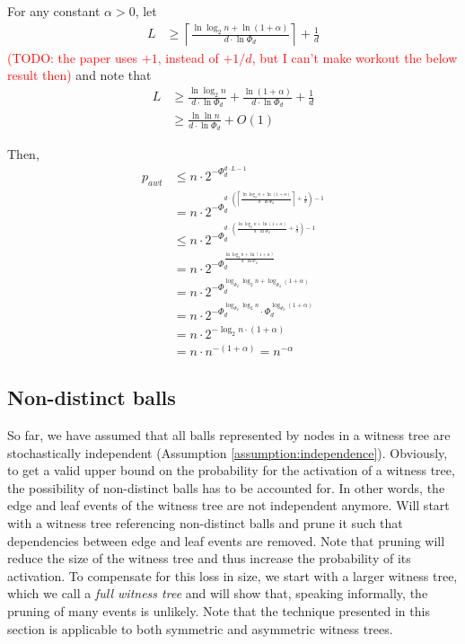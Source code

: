 \documentclass[a4paper,12pt]{article}
\newcommand\todo[1]{\textcolor{red}{(TODO: #1)}}
\begin{document}
For any constant $\alpha > 0$, let 
\begin{align}
L &\geq \left\lceil{\frac{\ln\log_2 n + \ln\left(1+\alpha\right)}{d\cdot \ln \Phi_d}}\right\rceil+\frac{1}{d}
\end{align}
\todo{the paper uses $+1$, instead of $+1/d$, but I can't make workout the below result then} and note that 
\begin{align}
L &\geq \frac{\ln\log_2 n}{d\cdot \ln \Phi_d} + \frac{\ln\left(1+\alpha\right)}{d\cdot \ln \Phi_d} + \frac{1}{d}\\
  &\geq \frac{\ln\ln n}{d\cdot \ln \Phi_d} + O\left(1\right)
\end{align}

Then, 
\begin{align}
p_{awt} &\leq n \cdot 2^{-\Phi_d^{d\cdot L -1}} \\
        &= n \cdot 2^{-\Phi_d^{d\cdot \left(\left\lceil{\frac{\ln\log_2 n + \ln\left(1+\alpha\right)}{d\cdot \ln \Phi_d}}\right\rceil+\frac{1}{d}\right) -1}} \\
        &\leq n \cdot 2^{-\Phi_d^{d\cdot \left({\frac{\ln\log_2 n + \ln\left(1+\alpha\right)}{d\cdot \ln \Phi_d}}+\frac{1}{d}\right) -1}} \\
        &= n \cdot 2^{-\Phi_d^{{\frac{\ln\log_2 n + \ln\left(1+\alpha\right)}{d\cdot \ln \Phi_d}}}} \\
        &= n \cdot 2^{-\Phi_d^{\log_{\Phi_d}\log_2 n + \log_{\Phi_d}\left(1+\alpha\right)}} \\
         &= n \cdot 2^{-\Phi_d^{\log_{\Phi_d}\log_2 n}\cdot \Phi_d^{ \log_{\Phi_d}\left(1+\alpha\right)}} \\
         &= n \cdot 2^{-\log_2 n \cdot\left(1+\alpha\right)} \\
         &= n \cdot n ^{-(1+\alpha)} = n^{-\alpha}
\end{align}

\subsection{Non-distinct balls}
\label{sec:analysis:nondistinctBalls}
So far, we have assumed that all balls represented by nodes in a witness tree are stochastically independent (Assumption \ref{assumption:independence}). Obviously, to get a valid upper bound on the probability for the activation of a witness tree, the possibility of non-distinct balls has to be accounted for. In other words, the edge and leaf events of the witness tree are not independent anymore. Will start with a witness tree referencing non-distinct balls and prune it such that dependencies between edge and leaf events are removed. Note that pruning will reduce the size of the witness tree and thus increase the probability of its activation. To compensate for this loss in size, we start with a larger witness tree, which we call a \emph{full witness tree} and will show that, speaking informally, the pruning of many events is unlikely. Note that the technique presented in this section is applicable to both symmetric and asymmetric witness trees. 
\end{document}
